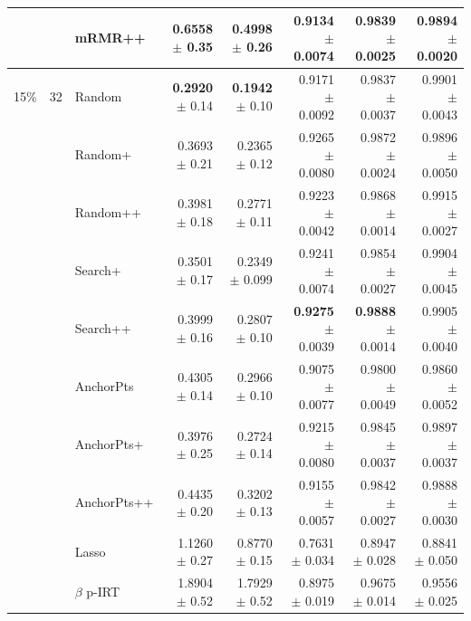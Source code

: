 \begin{longtable}{llp{}rrrrr}
 &  & mRMR++ & 0.6558 {\scriptsize $\pm$ 0.35} & 0.4998 {\scriptsize $\pm$ 0.26} & 0.9134 {\scriptsize $\pm$ 0.0074} & 0.9839 {\scriptsize $\pm$ 0.0025} & 0.9894 {\scriptsize $\pm$ 0.0020} \\
\midrule
15\% & 32 & Random & \textbf{0.2920} {\scriptsize $\pm$ 0.14} & \textbf{0.1942} {\scriptsize $\pm$ 0.10} & 0.9171 {\scriptsize $\pm$ 0.0092} & 0.9837 {\scriptsize $\pm$ 0.0037} & 0.9901 {\scriptsize $\pm$ 0.0043} \\
 &  & Random+ & 0.3693 {\scriptsize $\pm$ 0.21} & 0.2365 {\scriptsize $\pm$ 0.12} & 0.9265 {\scriptsize $\pm$ 0.0080} & 0.9872 {\scriptsize $\pm$ 0.0024} & 0.9896 {\scriptsize $\pm$ 0.0050} \\
 &  & Random++ & 0.3981 {\scriptsize $\pm$ 0.18} & 0.2771 {\scriptsize $\pm$ 0.11} & 0.9223 {\scriptsize $\pm$ 0.0042} & 0.9868 {\scriptsize $\pm$ 0.0014} & 0.9915 {\scriptsize $\pm$ 0.0027} \\
 &  & Search+ & 0.3501 {\scriptsize $\pm$ 0.17} & 0.2349 {\scriptsize $\pm$ 0.099} & 0.9241 {\scriptsize $\pm$ 0.0074} & 0.9854 {\scriptsize $\pm$ 0.0027} & 0.9904 {\scriptsize $\pm$ 0.0045} \\
 &  & Search++ & 0.3999 {\scriptsize $\pm$ 0.16} & 0.2807 {\scriptsize $\pm$ 0.10} & \textbf{0.9275} {\scriptsize $\pm$ 0.0039} & \textbf{0.9888} {\scriptsize $\pm$ 0.0014} & 0.9905 {\scriptsize $\pm$ 0.0040} \\
 &  & AnchorPts & 0.4305 {\scriptsize $\pm$ 0.14} & 0.2966 {\scriptsize $\pm$ 0.10} & 0.9075 {\scriptsize $\pm$ 0.0077} & 0.9800 {\scriptsize $\pm$ 0.0049} & 0.9860 {\scriptsize $\pm$ 0.0052} \\
 &  & AnchorPts+ & 0.3976 {\scriptsize $\pm$ 0.25} & 0.2724 {\scriptsize $\pm$ 0.14} & 0.9215 {\scriptsize $\pm$ 0.0080} & 0.9845 {\scriptsize $\pm$ 0.0037} & 0.9897 {\scriptsize $\pm$ 0.0037} \\
 &  & AnchorPts++ & 0.4435 {\scriptsize $\pm$ 0.20} & 0.3202 {\scriptsize $\pm$ 0.13} & 0.9155 {\scriptsize $\pm$ 0.0057} & 0.9842 {\scriptsize $\pm$ 0.0027} & 0.9888 {\scriptsize $\pm$ 0.0030} \\
 &  & Lasso & 1.1260 {\scriptsize $\pm$ 0.27} & 0.8770 {\scriptsize $\pm$ 0.15} & 0.7631 {\scriptsize $\pm$ 0.034} & 0.8947 {\scriptsize $\pm$ 0.028} & 0.8841 {\scriptsize $\pm$ 0.050} \\
 &  & $\beta$ p-IRT & 1.8904 {\scriptsize $\pm$ 0.52} & 1.7929 {\scriptsize $\pm$ 0.52} & 0.8975 {\scriptsize $\pm$ 0.019} & 0.9675 {\scriptsize $\pm$ 0.014} & 0.9556 {\scriptsize $\pm$ 0.025} \\

\end{longtable}
